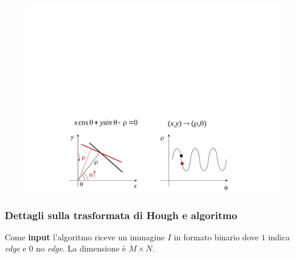 \documentclass[a4paper]{article}
\begin{document}
	\begin{figure}[!htp]
		\centering
		\includegraphics[width=\textwidth]{img/lab/TdF-2D-1.pdf}
	\end{figure}\newpage
	
	\subsubsection{Dettagli sulla trasformata di Hough e algoritmo}
	
	Come \textbf{input} l'algoritmo riceve un immagine $I$ in formato binario dove $1$ indica \emph{edge} e $0$ no \emph{edge}. La dimensione è $M \times N$.\newline
	
\end{document}
